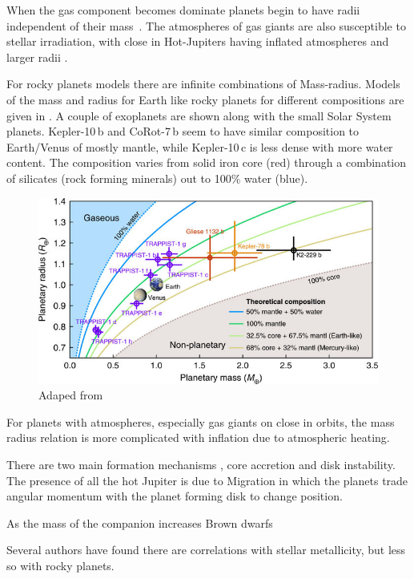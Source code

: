 When the gas component becomes dominate  planets begin to have radii independent of their mass~\citep[e.g.][]{lopez_understanding_2014}. The atmospheres of gas giants are also susceptible to stellar irradiation, with close in Hot-Jupiters having inflated atmospheres and larger radii \citep[e.g][]{fortney 2009}. 



For rocky planets models there are infinite combinations of Mass-radius. 
Models of the mass and radius for Earth like rocky planets for different compositions are given in . A couple of exoplanets are shown along with the small Solar System planets. {Kepler-10\,b} and {CoRot-7\,b} seem to have similar composition to Earth/Venus of mostly mantle, while {Kepler-10\,c} is less dense with more water content. The composition varies from solid iron core (red) through a combination of silicates (rock forming minerals) out to 100\% water (blue).


\begin{figure}
    \centering
    \includegraphics[width=0.7\linewidth]{figures/introduction/santerne_2018}
    \caption{Adaped from \citet{santerne_earthsized_2018}}
    \label{fig:santerne2018}
\end{figure}



For planets with atmospheres, especially gas giants on close in orbits, the mass radius relation is more complicated with inflation due to atmospheric heating.



There are two main formation mechanisms , core accretion and disk instability.
The presence of all the hot Jupiter is due to Migration in which the planets trade angular momentum with the planet forming disk to change position.

As the mass of the companion increases
Brown dwarfs

Several authors have found there are correlations with stellar metallicity, but less so with rocky planets.


